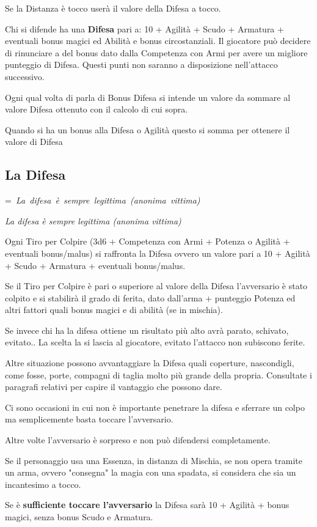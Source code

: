 \documentclass[a4paper,11pt,twoside,openany]{book}
\makeatletter
\newcommand{\mybox}[1]{%
	\setbox0=\hbox{#1}%
	\setlength{\@tempdima}{\dimexpr\wd0+13pt}%
	\begin{tcolorbox}[boxrule=0.5pt,arc=4pt, breakable,enhanced,
		left=6pt,right=6pt,top=6pt,bottom=6pt,boxsep=0pt,width=\@tempdima]
		#1
	\end{tcolorbox}
}
\makeatother
\begin{document}
Se la Distanza è tocco userà il valore della Difesa a tocco.

Chi si difende ha una \textbf{Difesa} pari a: 10 + Agilità + Scudo + Armatura + eventuali bonus magici ed Abilità e bonus circostanziali. 
Il giocatore può decidere di rinunciare a del bonus dato dalla Competenza con Armi per avere un migliore punteggio di Difesa. Questi punti non saranno a disposizione nell'attacco successivo.

Ogni qual volta di parla di Bonus Difesa si intende un valore da sommare al valore Difesa ottenuto con il calcolo di cui sopra.

Quando si ha un bonus alla Difesa o Agilità questo si somma per ottenere il valore di Difesa

\subsection{La Difesa}

\label{la-difesa}
\mybox{\textit{
		La difesa è sempre legittima (anonima vittima)
}}\medskip
Ogni Tiro per Colpire (3d6 + Competenza con Armi + Potenza o Agilità + eventuali bonus/malus) si raffronta la Difesa ovvero un valore pari a 10 + Agilità + Scudo + Armatura + eventuali bonus/malus.

Se il Tiro per Colpire è pari o superiore al valore della Difesa l'avversario è stato colpito e si stabilirà il grado di ferita, dato dall'arma + punteggio Potenza ed altri fattori quali bonus magici e di abilità (se in mischia).

Se invece chi ha la difesa ottiene un risultato più alto avrà parato, schivato, evitato.. La scelta la si lascia al giocatore, evitato l'attacco non subiscono ferite.

Altre situazione possono avvantaggiare la Difesa quali coperture, nascondigli, come fosse, porte, compagni di taglia molto più grande della propria. Consultate i paragrafi relativi per capire il vantaggio che possono dare.

Ci sono occasioni in cui non è importante penetrare la difesa e sferrare un colpo ma semplicemente basta toccare l'avversario.

Altre volte l'avversario è sorpreso e non può difendersi completamente.

Se il personaggio usa una Essenza, in distanza di Mischia, se non opera tramite un arma, ovvero "consegna" la magia con una spadata, si considera che sia un incantesimo a tocco.

Se è \textbf{sufficiente toccare l'avversario} la Difesa sarà 10 + Agilità + bonus magici, senza bonus Scudo e Armatura.
\end{document}

